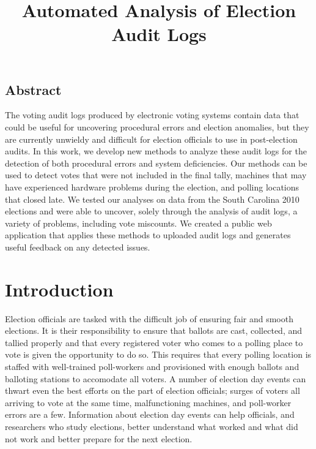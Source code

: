 \documentclass[letterpaper,twocolumn,10pt]{article}
\begin{document}
\date{}

\title{\Large \bf Automated Analysis of Election Audit Logs}

\author{
} %

\maketitle



\subsection*{Abstract}
The voting audit logs produced by electronic voting systems contain data
that could be useful for uncovering procedural errors and election anomalies,
but they 
are currently unwieldy and difficult for election officials to use in
post-election audits. In this work, we develop new methods to analyze these
audit logs for the detection of both procedural errors and system
deficiencies. Our methods can be used to detect votes that were not included in
the final tally, machines that may have experienced hardware problems during the
election, and polling locations that closed late. We tested our analyses on
data from the South Carolina 2010 elections and were able to uncover, solely
through the analysis of audit logs, a variety of problems, including vote
miscounts. We created a public web application that applies these methods to
uploaded audit logs and generates useful feedback on any detected issues.

 

\section{Introduction}
Election officials are tasked with the difficult job of ensuring fair
  and smooth elections. It is their responsibility to ensure that ballots are
  cast, collected, and tallied properly and that every registered voter who
  comes to a polling place to vote is given the opportunity to do so. This
  requires that every polling location is staffed with well-trained poll-workers
  and provisioned with enough ballots and balloting stations to accomodate all
  voters.  A number of election day events can thwart 
  even the best efforts on the part of election officials; surges of voters all
  arriving to vote at the same time, malfunctioning machines, and poll-worker
  errors are a few. Information about election day events can help officials,
  and researchers who study elections, better understand
  what worked and what did not work and better prepare for the next election.
\end{document}
